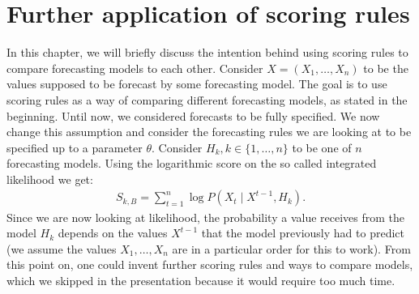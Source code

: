 \documentclass{def/tuberlin}
\theoremstyle{definition}
\theoremstyle{remark}
\begin{document}
\chapter{Further application of scoring rules}
In this chapter, we will briefly discuss the intention behind using scoring rules to compare forecasting models to each other. Consider $X=(X_1,\dots,X_n)$ to be the values supposed to be forecast by some forecasting model. The goal is to use scoring rules as a way of comparing different forecasting models, as stated in the beginning. Until now, we considered forecasts to be fully specified. We now change this assumption and consider the forecasting rules we are looking at to be specified up to a parameter $\theta$. Consider $H_k, k\in\{1,\dots,n\}$ to be one of $n$ forecasting models. Using the logarithmic score on the so called integrated likelihood we get: \begin{align*}
    S_{k,B}=\sum_{t=1}^n \log P(X_t\mid X^{t-1},H_k).
\end{align*}
Since we are now looking at likelihood, the probability a value receives from the model $H_k$ depends on the values $X^{t-1}$ that the model previously had to predict (we assume the values $X_1,\dots,X_n$ are in a particular order for this to work). From this point on, one could invent further scoring rules and ways to compare models, which we skipped in the presentation because it would require too much time.
\nocite{Unger}


\end{document}
